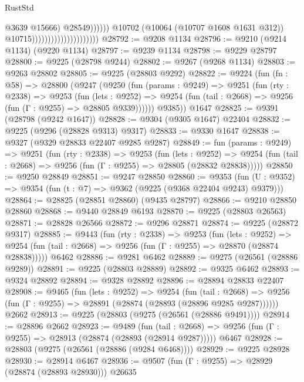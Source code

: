 \begin{lexlean}{RustStd}
\begin{coremodule}
                                                            @3639
                                                            @15666)
                                                          @28549))))))
                                              @10702
                                              (@10064 (@10707 @1608 @1631 @312))
                                              @10715)))))))))))))))))))))
@28792 := @9208 @1134
@28796 := @9210 (@9214 @1134) (@9220 @1134)
@28797 := @9239 @1134
@28798 := @9229 @28797
@28800 := @9225 (@28798 @9244)
@28802 := @9267 (@9268 @1134)
@28803 := @9263 @28802
@28805 := @9225 (@28803 @9292)
@28822 := @9224
    (fun (fn : @58) =>
    @28800
      (@9247
        (@9250
          (fun (params : @9249) =>
          @9251
            (fun (rty : @2338) =>
            @9253
              (fun (lets : @9252) =>
              @9254 (fun (tail : @2668) => @9256 (fun (Γ : @9255) => @28805 @9339))))))
        @9385))
    @1647
@28825 := @9391 (@28798 (@9242 @1647))
@28828 := @9304 (@9305 @1647) @22404
@28832 := @9225 (@9296 (@28828 @9313) @9317)
@28833 := @9330 @1647
@28838 := @9327 (@9329 @28833 @22407 @9285 @9287)
@28849 := fun (params : @9249) =>
  @9251
    (fun (rty : @2338) =>
    @9253
      (fun (lets : @9252) =>
      @9254 (fun (tail : @2668) => @9256 (fun (Γ : @9255) => @28805 (@28832 @28838)))))
@28850 := @9250 @28849
@28851 := @9247 @28850
@28860 := @9353
    (fun (U : @9352) => @9354 (fun (t : @7) => @9362 (@9225 (@9368 @22404 @9243) @9379)))
@28864 := @28825 (@28851 @28860) (@9435 @28797)
@28866 := @9210 @28850 @28860
@28868 := @9440 @28849 @6193
@28870 := @9225 (@28803 @26563)
@28871 := @28828 @26566
@28872 := @9296 @28871
@28874 := @9225 (@28872 @9317)
@28885 := @9443
    (fun (rty : @2338) =>
    @9253
      (fun (lets : @9252) =>
      @9254 (fun (tail : @2668) => @9256 (fun (Γ : @9255) => @28870 (@28874 @28838)))))
    @6462
@28886 := @9281 @6462
@28889 := @9275 (@26561 (@28886 @9289))
@28891 := @9225 (@28803 @28889)
@28892 := @9325 @6462
@28893 := @9324 @28892
@28894 := @9328 @28892
@28896 := @28894 @28833 @22407
@28908 := @9465
    (fun (lets : @9252) =>
    @9254
      (fun (tail : @2668) =>
      @9256 (fun (Γ : @9255) => @28891 (@28874 (@28893 (@28896 @9285 @9287))))))
    @2662
@28913 := @9225 (@28803 (@9275 (@26561 (@28886 @9491))))
@28914 := @28896 @2662
@28923 := @9489
    (fun (tail : @2668) => @9256 (fun (Γ : @9255) => @28913 (@28874 (@28893 (@28914 @9287)))))
    @6467
@28928 := @28803 (@9275 (@26561 (@28886 (@9284 @6468))))
@28929 := @9225 @28928
@28930 := @28914 @6467
@28936 := @9507 (fun (Γ : @9255) => @28929 (@28874 (@28893 @28930))) @26635

\end{coremodule}
\end{lexlean}
